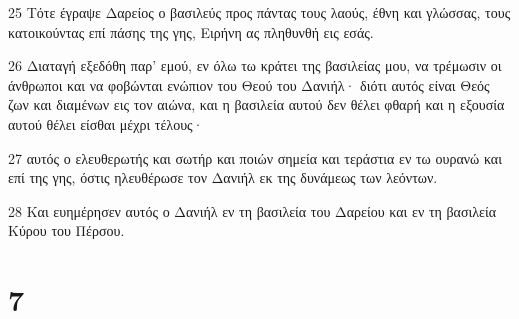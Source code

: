 \par 25 Τότε έγραψε Δαρείος ο βασιλεύς προς πάντας τους λαούς, έθνη και γλώσσας, τους κατοικούντας επί πάσης της γης, Ειρήνη ας πληθυνθή εις εσάς.
\par 26 Διαταγή εξεδόθη παρ' εμού, εν όλω τω κράτει της βασιλείας μου, να τρέμωσιν οι άνθρωποι και να φοβώνται ενώπιον του Θεού του Δανιήλ· διότι αυτός είναι Θεός ζων και διαμένων εις τον αιώνα, και η βασιλεία αυτού δεν θέλει φθαρή και η εξουσία αυτού θέλει είσθαι μέχρι τέλους·
\par 27 αυτός ο ελευθερωτής και σωτήρ και ποιών σημεία και τεράστια εν τω ουρανώ και επί της γης, όστις ηλευθέρωσε τον Δανιήλ εκ της δυνάμεως των λεόντων.
\par 28 Και ευημέρησεν αυτός ο Δανιήλ εν τη βασιλεία του Δαρείου και εν τη βασιλεία Κύρου του Πέρσου.

\chapter{7}

